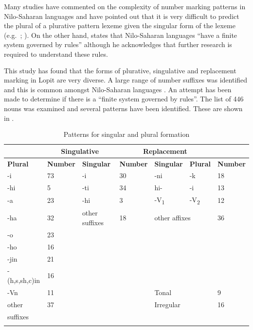 \documentclass[output=paper]{langsci/langscibook}
\begin{document}
Many studies have commented on the complexity of number marking patterns in Nilo-Saharan languages and have pointed out that it is very difficult to predict the plural of a plurative pattern lexeme given the singular form of the lexeme (e.g.\ \citealt[4]{TuckerMpaayei1955}; \citealt[3]{HildersLawrance1957}). On the other hand, \citet[255]{Dimmendaal2000} states that Nilo-Saharan languages “have a finite system governed by rules” although he acknowledges that further research is required to understand these rules. 

This study has found that the forms of plurative, singulative and replacement marking in Lopit are very diverse. A large range of number suffixes was identified and this is common amongst Nilo-Saharan languages \citep[219]{Dimmendaal2000}. An attempt has been made to determine if there is a “finite system governed by rules”. The list of 446 nouns was examined and several patterns have been identified. These are shown in . 

\begin{table}
\begin{tabularx}{\textwidth}{lXXXXXX}
\lsptoprule

\multicolumn{2}{c}{ \textbf{Plurative}} & \multicolumn{2}{c}{ \textbf{Singulative}} & \multicolumn{3}{c}{ \textbf{Replacement}}\\ \midrule
 \textbf{Plural} & \textbf{Number} & \textbf{Singular} & \textbf{Number} & \textbf{Singular} & \textbf{Plural} & \textbf{Number}\\ \midrule
 {}-i & 73 &  {}-i & 30 &  {}-ni &  {}-k & 18\\
 {}-hi & 5 &  {}-ti & 34 &  hi- &  {}-i & 13\\
 {}-a & 23 &  {}-hi & 3 & {}-{V}{\textsubscript{1}} &  {}-V\textsubscript{2} & 12\\
 {}-ha & 32 & other suffixes & 18 & \multicolumn{2}{l}{other affixes} & 36\\
 {}-o & 23 &  &  &  &  & \\
 {}-ho & 16 &  &  &  &  & \\
 {}-jin & 21 &  &  &  &  & \\
 {}-(h,s,sh,c)in & 16 &  &  &  &  & \\
\hhline{~~~~---}
 {}-Vn & 11 &  &  & Tonal &  & 9\\
other & 37 &  &  & Irregular &  & 16\\
suffixes & & & & & & \\
\lspbottomrule
\end{tabularx}
\caption{Patterns for singular and plural formation}
\label{tab:moodie:9}
\end{table}
\end{document}
